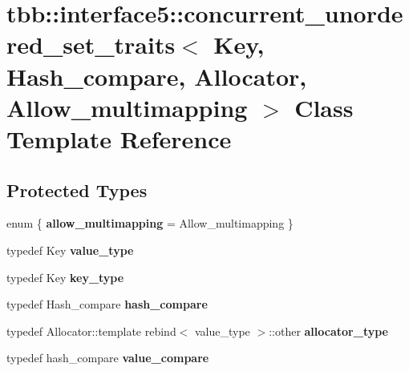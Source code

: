 \hypertarget{classtbb_1_1interface5_1_1concurrent__unordered__set__traits}{}\section{tbb\+:\+:interface5\+:\+:concurrent\+\_\+unordered\+\_\+set\+\_\+traits$<$ Key, Hash\+\_\+compare, Allocator, Allow\+\_\+multimapping $>$ Class Template Reference}
\label{classtbb_1_1interface5_1_1concurrent__unordered__set__traits}
\subsection*{Protected Types}
\begin{DoxyCompactItemize}
\item 
\hypertarget{classtbb_1_1interface5_1_1concurrent__unordered__set__traits_afcf11aeeb946abb8bfc9ec1f010ec9b6}{}enum \{ {\bfseries allow\+\_\+multimapping} = Allow\+\_\+multimapping
 \}\label{classtbb_1_1interface5_1_1concurrent__unordered__set__traits_afcf11aeeb946abb8bfc9ec1f010ec9b6}

\item 
\hypertarget{classtbb_1_1interface5_1_1concurrent__unordered__set__traits_a935ab6e249964c5a7e1caffd308bf008}{}typedef Key {\bfseries value\+\_\+type}\label{classtbb_1_1interface5_1_1concurrent__unordered__set__traits_a935ab6e249964c5a7e1caffd308bf008}

\item 
\hypertarget{classtbb_1_1interface5_1_1concurrent__unordered__set__traits_a8b1d770b7db20b5d0d51af0b910aebb2}{}typedef Key {\bfseries key\+\_\+type}\label{classtbb_1_1interface5_1_1concurrent__unordered__set__traits_a8b1d770b7db20b5d0d51af0b910aebb2}

\item 
\hypertarget{classtbb_1_1interface5_1_1concurrent__unordered__set__traits_a3c1ef314e63eb78db91ce99cb8617b87}{}typedef Hash\+\_\+compare {\bfseries hash\+\_\+compare}\label{classtbb_1_1interface5_1_1concurrent__unordered__set__traits_a3c1ef314e63eb78db91ce99cb8617b87}

\item 
\hypertarget{classtbb_1_1interface5_1_1concurrent__unordered__set__traits_a453126bb05d3c798914cb91852e0b3a5}{}typedef Allocator\+::template rebind$<$ value\+\_\+type $>$\+::other {\bfseries allocator\+\_\+type}\label{classtbb_1_1interface5_1_1concurrent__unordered__set__traits_a453126bb05d3c798914cb91852e0b3a5}

\item 
\hypertarget{classtbb_1_1interface5_1_1concurrent__unordered__set__traits_aa846331955302afdcaa6ba10e47ff427}{}typedef hash\+\_\+compare {\bfseries value\+\_\+compare}\label{classtbb_1_1interface5_1_1concurrent__unordered__set__traits_aa846331955302afdcaa6ba10e47ff427}

\end{DoxyCompactItemize}
